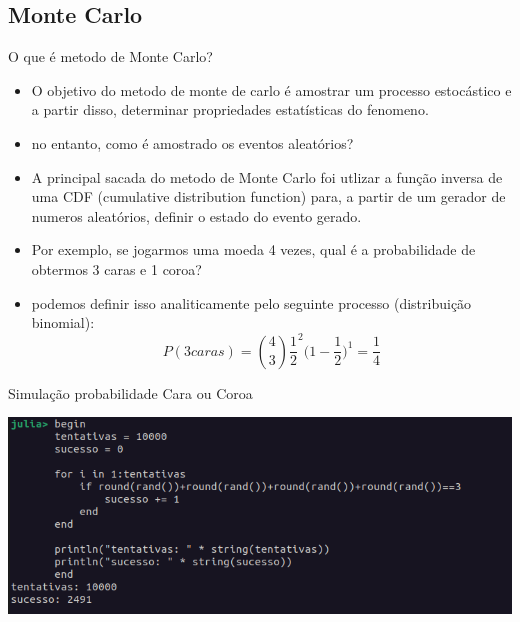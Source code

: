 \documentclass{beamer}
\begin{document}
		\subsection{Monte Carlo}
		\begin{frame}{O que é metodo de Monte Carlo?}
			\begin{itemize}[<+->]
				\item O objetivo do metodo de monte de carlo é amostrar um processo estocástico e a partir disso, determinar propriedades estatísticas do fenomeno.
				\item no entanto, como é amostrado os eventos aleatórios?
				\item A principal sacada do metodo de Monte Carlo foi utlizar a função inversa de uma CDF (cumulative distribution function) para, a partir de um gerador de numeros aleatórios, definir o estado do evento gerado.
				\item Por exemplo, se jogarmos uma moeda 4 vezes, qual é a probabilidade de obtermos 3 caras e 1 coroa?
				\item podemos definir isso analiticamente pelo seguinte processo (distribuição binomial):
				\begin{equation}
					P(3 caras) = \binom{4}{3}\frac{1}{2}^2\big(1-\frac{1}{2})^1 = \frac{1}{4}
				\end{equation}
			\end{itemize}
		\end{frame}
		\begin{frame}{Simulação probabilidade Cara ou Coroa}
		\begin{center}
			\includegraphics[width=\textwidth]{simul-monte-carlo}
		\end{center}
		\end{frame}
\end{document}
